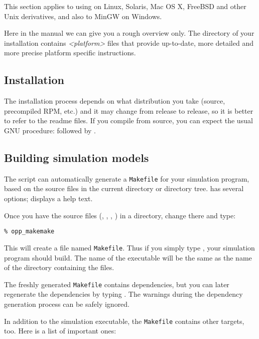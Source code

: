 This section applies to using {\opp} on Linux, Solaris, Mac OS X, FreeBSD and
other Unix derivatives, and also to MinGW on Windows.

Here in the manual we can give you a rough overview only.
The  directory of your {\opp} installation contains
\textit{<platform>} files that provide
up-to-date, more detailed and more precise platform specific
instructions.


\subsection{Installation}

The installation process depends on what distribution you take
(source, precompiled RPM, etc.) and it may change from release
to release, so it is better to refer to the readme files.
If you compile from source, you can expect the usual GNU
procedure:  followed by .


\subsection{Building simulation models}

The  script can automatically generate a
\texttt{Makefile} for your simulation program, based on the source files
in the current directory or directory tree.
 has several options; 
displays a help text.

Once you have the source files (, , ,
) in a directory, change there and type:

\begin{verbatim}
% opp_makemake
\end{verbatim}

This will create a file named \texttt{Makefile}. Thus if you
simply type , your simulation program should build. The name of
the executable will be the same as the name of the directory
containing the files.


The freshly generated \texttt{Makefile} contains
dependencies, but you can later
regenerate the dependencies by typing .
The warnings during the dependency generation process can
be safely ignored.

In addition to the simulation executable, the \texttt{Makefile}
contains other targets, too. Here is a list of important ones:


